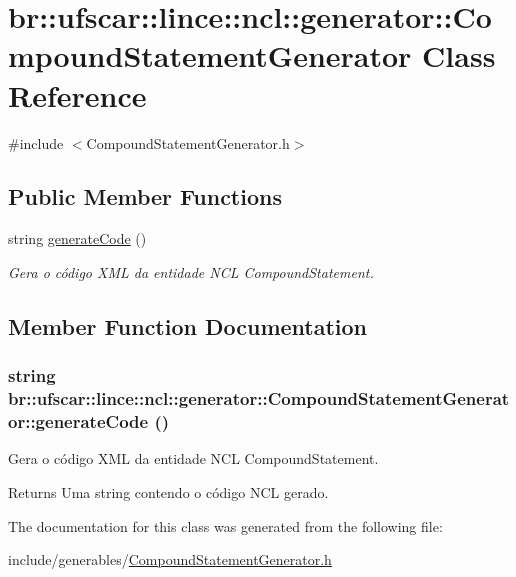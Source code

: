 \hypertarget{classbr_1_1ufscar_1_1lince_1_1ncl_1_1generator_1_1CompoundStatementGenerator}{
\section{br::ufscar::lince::ncl::generator::CompoundStatementGenerator Class Reference}
\label{classbr_1_1ufscar_1_1lince_1_1ncl_1_1generator_1_1CompoundStatementGenerator}
}


{\ttfamily \#include $<$CompoundStatementGenerator.h$>$}

\subsection*{Public Member Functions}
\begin{DoxyCompactItemize}
\item 
string \hyperlink{classbr_1_1ufscar_1_1lince_1_1ncl_1_1generator_1_1CompoundStatementGenerator_a9150d3d11175e9e3163ddacc68274ba7}{generateCode} ()
\begin{DoxyCompactList}\small\item\em Gera o código XML da entidade NCL CompoundStatement. \item\end{DoxyCompactList}\end{DoxyCompactItemize}


\subsection{Member Function Documentation}
\hypertarget{classbr_1_1ufscar_1_1lince_1_1ncl_1_1generator_1_1CompoundStatementGenerator_a9150d3d11175e9e3163ddacc68274ba7}{
\subsubsection[{generateCode}]{\setlength{\rightskip}{0pt plus 5cm}string br::ufscar::lince::ncl::generator::CompoundStatementGenerator::generateCode ()}}
\label{classbr_1_1ufscar_1_1lince_1_1ncl_1_1generator_1_1CompoundStatementGenerator_a9150d3d11175e9e3163ddacc68274ba7}


Gera o código XML da entidade NCL CompoundStatement. 

\begin{DoxyReturn}{Returns}
Uma string contendo o código NCL gerado. 
\end{DoxyReturn}


The documentation for this class was generated from the following file:\begin{DoxyCompactItemize}
\item 
include/generables/\hyperlink{CompoundStatementGenerator_8h}{CompoundStatementGenerator.h}\end{DoxyCompactItemize}

